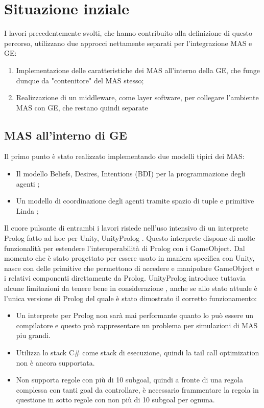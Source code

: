 \section{Situazione inziale}

I lavori precedentemente svolti, che hanno contribuito alla definizione di questo percorso, utilizzano due approcci nettamente separati per l'integrazione MAS e GE:
\begin{enumerate}
	\item Implementazione delle caratteristiche dei MAS all'interno della GE, che funge dunque da "contenitore" del MAS stesso;
	\item Realizzazione di un middleware, come layer software, per collegare l'ambiente MAS con GE, che restano quindi separate
\end{enumerate}

\subsection{MAS all'interno di GE} \label{MAS_dentro_GE}

Il primo punto è stato realizzato implementando due modelli tipici dei MAS:
\begin{itemize}
	\item Il modello Beliefs, Desires, Intentions (BDI) per la programmazione degli agenti \cite{amslaurea15657};
	\item Un modello di coordinazione degli agenti tramite spazio di tuple e primitive Linda \cite{amslaurea8424}\cite{amslaurea16100};
\end{itemize}

Il cuore pulsante di entrambi i lavori risiede nell'uso intensivo di un interprete Prolog fatto ad hoc per Unity, UnityProlog \cite{unity_prolog}. Questo interprete dispone di molte funzionalità per estendere l'interoperabilità di Prolog con i GameObject.
Dal momento che è stato progettato per essere usato in maniera specifica con Unity, nasce con delle primitive che permettono di accedere e manipolare GameObject e i relativi componenti direttamente da Prolog. UnityProlog introduce tuttavia alcune limitazioni da tenere bene in considerazione \cite{amslaurea15657}, anche se allo stato attuale è l'unica versione di Prolog del quale è stato dimostrato il corretto funzionamento:
\begin{itemize}
	\item Un interprete per Prolog non sarà mai performante quanto lo può essere un compilatore e questo può rappresentare un problema per simulazioni di MAS piu grandi.
	\item Utilizza lo stack C\# come stack di esecuzione, quindi la tail call optimization non è ancora supportata.
	\item Non supporta regole con più di 10 subgoal, quindi a fronte di una regola complessa con tanti goal da controllare, è necessario frammentare la regola in questione in sotto regole con non più di 10 subgoal per ognuna.
\end{itemize}

